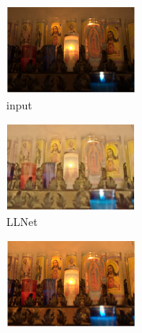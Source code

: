 \documentclass[letterpaper,12pt]{article}
\begin{document}
	\begin{figure}[htbp] 
		\centering 
		\begin{subfigure}{0.18\textwidth}
			\includegraphics[width=\linewidth]{MIT-Adobe_FiveK/input}
			\captionsetup{font=scriptsize}
			\caption{input}
			\label{fig: MIT-Adobe_FiveK_a}
		\end{subfigure}
		\begin{subfigure}{0.18\textwidth}
			\includegraphics[width=\linewidth]{MIT-Adobe_FiveK/LLNet}
			\captionsetup{font=scriptsize}
			\caption{LLNet}
			\label{fig: MIT-Adobe_FiveK_b}
		\end{subfigure}
		\begin{subfigure}{0.18\textwidth}
			\includegraphics[width=\linewidth]{MIT-Adobe_FiveK/LightenNet}

\end{subfigure}
\end{figure}
\end{document}
